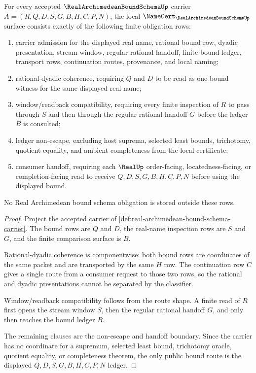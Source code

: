\begin{theorem}
\label{thm:real-archimedean-bound-schema-obligations}
For every accepted $\RealArchimedeanBoundSchemaUp$ carrier $A=(R,Q,D,S,G,B,H,C,P,N)$, the local $\NameCert_{\RealArchimedeanBoundSchemaUp}$ surface consists exactly of the following finite obligation rows:
\begin{enumerate}
\item carrier admission for the displayed real name, rational bound row, dyadic presentation, stream window, regular rational handoff, finite bound ledger, transport rows, continuation routes, provenance, and local naming;
\item rational-dyadic coherence, requiring $Q$ and $D$ to be read as one bound witness for the same displayed real name;
\item window/readback compatibility, requiring every finite inspection of $R$ to pass through $S$ and then through the regular rational handoff $G$ before the ledger $B$ is consulted;
\item ledger non-escape, excluding host suprema, selected least bounds, trichotomy, quotient equality, and ambient completeness from the local certificate;
\item consumer handoff, requiring each $\RealUp$ order-facing, locatedness-facing, or completion-facing read to receive $Q,D,S,G,B,H,C,P,N$ before using the displayed bound.
\end{enumerate}
No Real Archimedean bound schema obligation is stored outside these rows.
\end{theorem}
\begin{proof}
Project the accepted carrier of \autoref{def:real-archimedean-bound-schema-carrier}. The bound rows are $Q$ and $D$, the real-name inspection rows are $S$ and $G$, and the finite comparison surface is $B$.

Rational-dyadic coherence is componentwise: both bound rows are coordinates of the same packet and are transported by the same $H$ row. The continuation row $C$ gives a single route from a consumer request to those two rows, so the rational and dyadic presentations cannot be separated by the classifier.

Window/readback compatibility follows from the route shape. A finite read of $R$ first opens the stream window $S$, then the regular rational handoff $G$, and only then reaches the bound ledger $B$.

The remaining clauses are the non-escape and handoff boundary. Since the carrier has no coordinate for a supremum, selected least bound, trichotomy oracle, quotient equality, or completeness theorem, the only public bound route is the displayed $Q,D,S,G,B,H,C,P,N$ ledger.
\end{proof}

